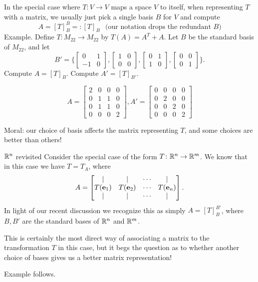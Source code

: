 \begin{frame}
In the special case where $T\colon V\rightarrow V$ maps a space $V$ \alert{to itself}, when representing $T$ with a matrix, we usually just pick a single basis $B$ for $V$ and compute 
\[
A=[T]_{B}^{B}=:[T]_B \hspace{5pt} \text{ (our notation drops the redundant $B$)}
\]
\bpause
\alert{Example}. Define $T\colon M_{22}\rightarrow M_{22}$ by $T(A)=A^T+A$. 
\bspace
Let $B$ be the standard basis of $M_{22}$, and let 
\[
B'=\{
\begin{bmatrix}
0&1\\
-1&0
\end{bmatrix},
\begin{bmatrix}
1&0\\
0&0
\end{bmatrix},
\begin{bmatrix}
0&1\\
1&0
\end{bmatrix},
\begin{bmatrix}
0&0\\
0&1
\end{bmatrix}
\}.
\]
\bb
\ii Compute $A=[T]_B$. 
\ii Compute $A'=[T]_{B'}$.
\ee
\begin{bsolution}
\[ A=\begin{bmatrix}
2&0&0&0\\
0&1&1&0\\
0&1&1&0\\
0&0&0&2
\end{bmatrix}, A'=\begin{bmatrix}
0&0&0&0\\
0&2&0&0\\
0&0&2&0\\
0&0&0&2
\end{bmatrix}
\]
\end{bsolution}
\alert{Moral:} our choice of basis affects the matrix representing $T$, and some choices are better than others!
\end{frame}
\begin{frame}{${\mathbb R}^n$ revisited}
Consider the \alert{special case} of the form $T\colon {\mathbb R}^n\rightarrow {\mathbb R}^m$. We know that in this case we have $T=T_A$, where 
\[
A=
\begin{bmatrix}
\vert&\vert&\cdots &\vert \\
T({\mathbf e}_1)& T({\mathbf e}_2)&\cdots &T({\mathbf e}_n)\\
\vert&\vert&\cdots &\vert
\end{bmatrix}.
\] 
In light of our recent discussion we recognize this as simply $A=[T]_{B}^{B'}$, where $B,B'$ are the \alert{standard bases} of ${\mathbb R}^n$ and ${\mathbb R}^m$. 

\bpause
This is certainly the most direct way of associating a matrix to the transformation $T$ in this case, but it begs the question as to whether another choice of bases gives us a \alert{better} matrix representation!

Example follows. 
\end{frame}
